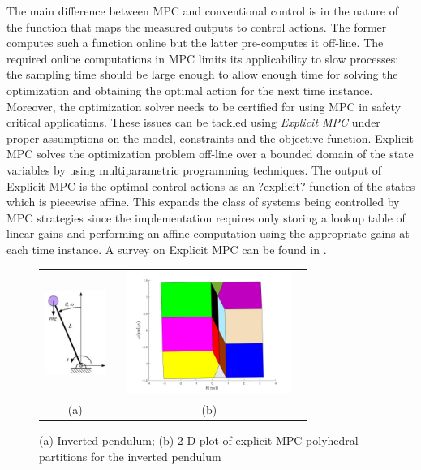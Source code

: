  The main difference between MPC and conventional control is in the nature of the function that maps the measured outputs to control actions. The former computes such a function online but the latter pre-computes it off-line. The required online computations in MPC limits its applicability to slow processes: the sampling time should be large enough to allow enough time for solving the optimization and obtaining the optimal action for the next time instance. Moreover, the optimization solver needs to be certified for using MPC in safety critical applications.
These issues can be tackled using \emph{Explicit MPC} under proper assumptions on the model, constraints and the objective function. Explicit MPC solves the optimization problem off-line over a bounded domain of the state variables by using multiparametric programming techniques. The output of Explicit MPC is the optimal control actions as an ?explicit? function of the states which is piecewise affine. This expands the class of systems being controlled by MPC strategies since the implementation requires only storing a lookup table of linear gains and performing an affine computation using the appropriate gains at each time instance. A survey on Explicit MPC can be found in \cite{Alessio2009}.\\
\begin{figure}[t]
	\label{fig:inverted_pendulum}
	\begin{tabular}{cc}
	\includegraphics[width=2cm,height=4cm]{Figs/inv_pend.png}&	\includegraphics[width=6cm,height=4cm]{Figs/regs.jpg}\\
	(a)&(b)
	\end{tabular}
	\caption{(a) Inverted pendulum; (b) 2-D plot of explicit MPC polyhedral partitions for the inverted pendulum}
\end{figure}
